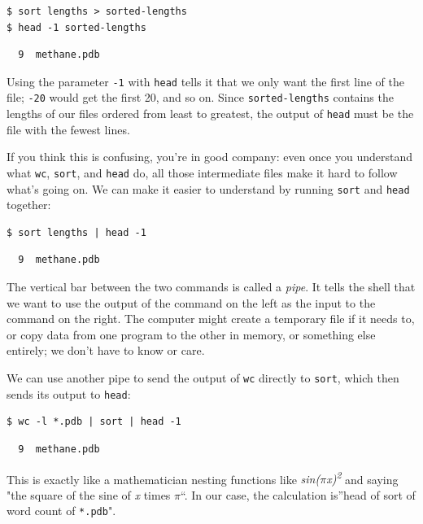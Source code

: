 \documentclass[]{book}
\newcommand{\gdef}[2]{\emph{#2}}
\begin{document}
\begin{verbatim}
$ sort lengths > sorted-lengths
$ head -1 sorted-lengths
\end{verbatim}

\begin{verbatim}
  9  methane.pdb
\end{verbatim}

Using the parameter \texttt{-1} with \texttt{head} tells it that we only
want the first line of the file; \texttt{-20} would get the first 20,
and so on. Since \texttt{sorted-lengths} contains the lengths of our
files ordered from least to greatest, the output of \texttt{head} must
be the file with the fewest lines.

If you think this is confusing, you're in good company: even once you
understand what \texttt{wc}, \texttt{sort}, and \texttt{head} do, all
those intermediate files make it hard to follow what's going on. We can
make it easier to understand by running \texttt{sort} and \texttt{head}
together:

\begin{verbatim}
$ sort lengths | head -1
\end{verbatim}

\begin{verbatim}
  9  methane.pdb
\end{verbatim}

The vertical bar between the two commands is called a
\gdef{g:pipe}{pipe}. It tells the shell that we want to use the
output of the command on the left as the input to the command on the
right. The computer might create a temporary file if it needs to, or
copy data from one program to the other in memory, or something else
entirely; we don't have to know or care.

We can use another pipe to send the output of \texttt{wc} directly to
\texttt{sort}, which then sends its output to \texttt{head}:

\begin{verbatim}
$ wc -l *.pdb | sort | head -1
\end{verbatim}

\begin{verbatim}
  9  methane.pdb
\end{verbatim}

This is exactly like a mathematician nesting functions like
\emph{sin($\pi$x)\textsuperscript{2}} and saying "the square of the sine of
\emph{x} times $\pi$``. In our case, the calculation is''head of sort of
word count of \texttt{*.pdb}".
\end{document}
